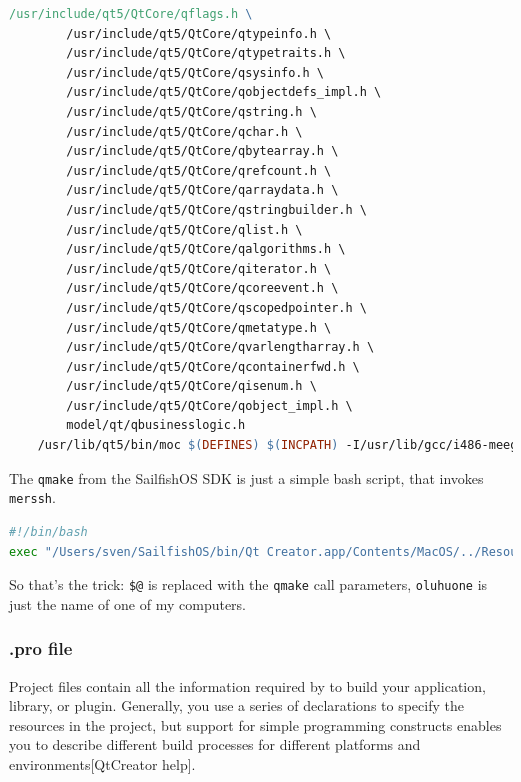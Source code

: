\begin{lstlisting}[language=make]
		/usr/include/qt5/QtCore/qflags.h \
		/usr/include/qt5/QtCore/qtypeinfo.h \
		/usr/include/qt5/QtCore/qtypetraits.h \
		/usr/include/qt5/QtCore/qsysinfo.h \
		/usr/include/qt5/QtCore/qobjectdefs_impl.h \
		/usr/include/qt5/QtCore/qstring.h \
		/usr/include/qt5/QtCore/qchar.h \
		/usr/include/qt5/QtCore/qbytearray.h \
		/usr/include/qt5/QtCore/qrefcount.h \
		/usr/include/qt5/QtCore/qarraydata.h \
		/usr/include/qt5/QtCore/qstringbuilder.h \
		/usr/include/qt5/QtCore/qlist.h \
		/usr/include/qt5/QtCore/qalgorithms.h \
		/usr/include/qt5/QtCore/qiterator.h \
		/usr/include/qt5/QtCore/qcoreevent.h \
		/usr/include/qt5/QtCore/qscopedpointer.h \
		/usr/include/qt5/QtCore/qmetatype.h \
		/usr/include/qt5/QtCore/qvarlengtharray.h \
		/usr/include/qt5/QtCore/qcontainerfwd.h \
		/usr/include/qt5/QtCore/qisenum.h \
		/usr/include/qt5/QtCore/qobject_impl.h \
		model/qt/qbusinesslogic.h
	/usr/lib/qt5/bin/moc $(DEFINES) $(INCPATH) -I/usr/lib/gcc/i486-meego-linux/4.6.4/../../../../include/c++/4.6.4 -I/usr/lib/gcc/i486-meego-linux/4.6.4/../../../../include/c++/4.6.4/i486-meego-linux -I/usr/lib/gcc/i486-meego-linux/4.6.4/../../../../include/c++/4.6.4/backward -I/usr/lib/gcc/i486-meego-linux/4.6.4/include -I/usr/local/include -I/usr/include model/qt/qbusinesslogic.h -o moc/moc_qbusinesslogic.cpp
\end{lstlisting}
%
The \verb,qmake, from the SailfishOS SDK is just a simple bash script, that invokes \verb,merssh,.
%
\begin{lstlisting}[language=bash]
#!/bin/bash
exec "/Users/sven/SailfishOS/bin/Qt Creator.app/Contents/MacOS/../Resources/merssh" -sdktoolsdir "/Users/sven/.config/SailfishAlpha3/mer-sdk-tools/MerSDK" -commandtype mb2 -mertarget SailfishOS-i486-x86 qmake $@oluhuone:SailfishOS-i486-x86
\end{lstlisting}
%
So that's the trick: \verb,$@, is replaced with the \verb,qmake, call parameters, \verb,oluhuone, is just the name of one of my computers.
%
%
\subsubsection{.pro file}
%
Project files contain all the information required by  to build your application, library, or plugin. Generally, you use a series of declarations to specify the resources in the project, but support for simple programming constructs enables you to describe different build processes for different platforms and environments[QtCreator help].

